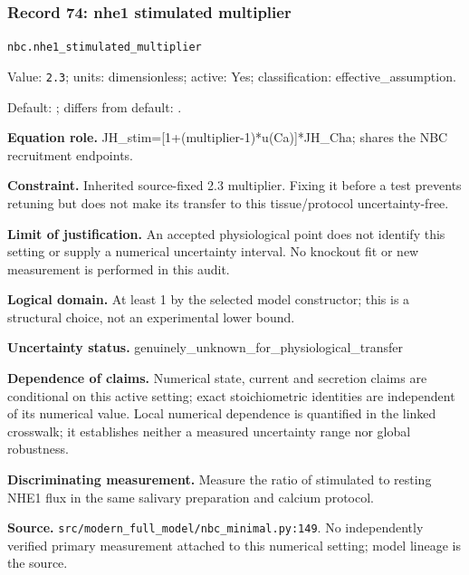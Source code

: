\subsubsection*{Record 74: nhe1 stimulated multiplier}
{\small \nolinkurl{nbc.nhe1_stimulated_multiplier}\par

Value: \texttt{2.3}; units: dimensionless; active: Yes; classification: effective\_assumption.\par

Default: ; differs from default: .\par

\textbf{Equation role.} JH\_stim=[1+(multiplier-1)*u(Ca)]*JH\_Cha; shares the NBC recruitment endpoints.\par

\textbf{Constraint.} Inherited source-fixed 2.3 multiplier. Fixing it before a test prevents retuning but does not make its transfer to this tissue/protocol uncertainty-free.\par

\textbf{Limit of justification.} An accepted physiological point does not identify this setting or supply a numerical uncertainty interval. No knockout fit or new measurement is performed in this audit.\par

\textbf{Logical domain.} At least 1 by the selected model constructor; this is a structural choice, not an experimental lower bound.\par

\textbf{Uncertainty status.} genuinely\_unknown\_for\_physiological\_transfer\par

\textbf{Dependence of claims.} Numerical state, current and secretion claims are conditional on this active setting; exact stoichiometric identities are independent of its numerical value. Local numerical dependence is quantified in the linked crosswalk; it establishes neither a measured uncertainty range nor global robustness.\par

\textbf{Discriminating measurement.} Measure the ratio of stimulated to resting NHE1 flux in the same salivary preparation and calcium protocol.\par

\textbf{Source.} \nolinkurl{src/modern_full_model/nbc_minimal.py:149}. No independently verified primary measurement attached to this numerical setting; model lineage is the source.\par}

